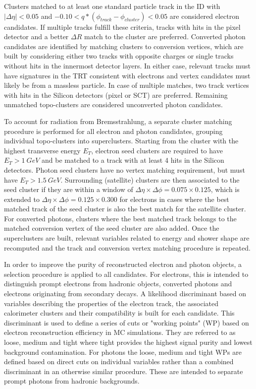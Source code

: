 Clusters matched to at least one standard particle track in the ID with $|\Delta\eta| < 0.05$ and 
$-0.10 < q*(\phi_{track}-\phi_{cluster}) < 0.05$ are considered electron candidates. If multiple tracks fulfill these 
criteria, tracks with hits in the pixel detector and a better $\Delta R$ match to the cluster are preferred. Converted 
photon candidates are identified by matching clusters to conversion vertices, which are built by considering either 
two tracks with opposite charges or single tracks without hits in the innermost detector layers. In either case, 
relevant tracks must have signatures in the TRT consistent with electrons and vertex candidates must likely be from 
a massless particle. In case of multiple matches, two track vertices with hits in the Silicon detectors (pixel or SCT) 
are preferred. Remaining unmatched topo-clusters are considered unconverted photon candidates. \par

To account for radiation from Bremsstrahlung, a separate cluster matching procedure is performed for all electron and 
photon candidates, grouping individual topo-clusters into superclusters. Starting from the cluster with the highest 
transverse energy $E_T$, electron seed clusters are required to have $E_T > 1\ GeV$ and be matched to a track with 
at least 4 hits in the Silicon detectors. Photon seed clusters have no vertex matching requirement, but must have 
$E_T > 1.5\ GeV$. Surrounding (satellite) clusters are then associated to the seed cluster if they are within a window 
of $\Delta\eta\times\Delta\phi =0.075\times0.125$, which is extended to $\Delta\eta\times\Delta\phi =0.125\times0.300$ 
for electrons in cases where the best matched track of the seed cluster is also the best match for the satellite 
cluster. For converted photons, clusters where the best matched track belongs to the matched conversion vertex of the 
seed cluster are also added. Once the superclusters are built, relevant variables related to energy and shower shape 
are recomputed and the track and conversion vertex matching procedure is repeated. \par

In order to improve the purity of reconstructed electron and photon objects, a selection procedure is applied to all 
candidates. For electrons, this is intended to distinguish prompt electrons from hadronic objects, converted photons 
and electrons originating from secondary decays. A likelihood discriminant based on variables describing the properties 
of the electron track, the associated calorimeter clusters and their compatibility is built for each candidate. This 
discriminant is used to define a series of cuts or "working points" (WP) based on electron reconstruction efficiency 
in MC simulations. They are referred to as loose, medium and tight where tight provides the highest signal purity and 
lowest background contamination. For photons the loose, medium and tight WPs are defined based on direct cuts on 
individual variables rather than a combined discriminant in an otherwise similar procedure. These are intended to 
separate prompt photons from hadronic backgrounds. \par

